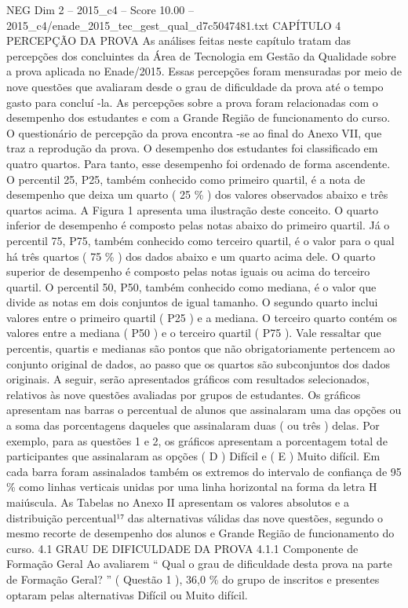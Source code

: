 \begin{textsample}{NEG Dim 2 – 2015\_c4 – Score 10.00 – 2015\_c4/enade\_2015\_tec\_gest\_qual\_d7c5047481.txt}  \label{ex:f2_neg_348}
CAPÍTULO 4 PERCEPÇÃO DA PROVA As análises feitas neste capítulo tratam das percepções dos concluintes da Área de Tecnologia em Gestão da Qualidade sobre a prova aplicada no Enade/2015.
Essas percepções foram mensuradas por meio de nove questões que avaliaram desde o grau de dificuldade da prova até o tempo gasto para concluí -la.
As percepções sobre a prova foram relacionadas com o desempenho dos estudantes e com a Grande Região de funcionamento do curso.
O questionário de percepção da prova encontra -se ao final do Anexo VII, que traz a reprodução da prova.
O desempenho dos estudantes foi classificado em quatro quartos.
Para tanto, esse desempenho foi ordenado de forma ascendente.
O percentil 25, P25, também conhecido como primeiro quartil, é a nota de desempenho que deixa um quarto ( 25 \% ) dos valores observados abaixo e três quartos acima.
A Figura 1 apresenta uma ilustração deste conceito.
O quarto inferior de desempenho é composto pelas notas abaixo do primeiro quartil.
Já o percentil 75, P75, também conhecido como terceiro quartil, é o valor para o qual há três quartos ( 75 \% ) dos dados abaixo e um quarto acima dele.
O quarto superior de desempenho é composto pelas notas iguais ou acima do terceiro quartil.
O percentil 50, P50, também conhecido como mediana, é o valor que divide as notas em dois conjuntos de igual tamanho.
O segundo quarto inclui valores entre o primeiro quartil ( P25 ) e a mediana.
O terceiro quarto contém os valores entre a mediana ( P50 ) e o terceiro quartil ( P75 ).
Vale ressaltar que percentis, quartis e medianas são pontos que não obrigatoriamente pertencem ao conjunto original de dados, ao passo que os quartos são subconjuntos dos dados originais.
A seguir, serão apresentados gráficos com resultados selecionados, relativos às nove questões avaliadas por grupos de estudantes.
Os gráficos apresentam nas barras o percentual de alunos que assinalaram uma das opções ou a soma das porcentagens daqueles que assinalaram duas ( ou três ) delas.
Por exemplo, para as questões 1 e 2, os gráficos apresentam a porcentagem total de participantes que assinalaram as opções ( D ) Difícil e ( E ) Muito difícil.
Em cada barra foram assinalados também os extremos do intervalo de confiança de 95 \% como linhas verticais unidas por uma linha horizontal na forma da letra H maiúscula.
As Tabelas no Anexo II apresentam os valores absolutos e a distribuição percentual¹⁷ das alternativas válidas das nove questões, segundo o mesmo recorte de desempenho dos alunos e Grande Região de funcionamento do curso. 4.1 GRAU DE DIFICULDADE DA PROVA 4.1.1 Componente de Formação Geral Ao avaliarem “ Qual o grau de dificuldade desta prova na parte de Formação Geral? ” ( Questão 1 ), 36,0 \% do grupo de inscritos e presentes optaram pelas alternativas Difícil ou Muito difícil.

\end{textsample}
